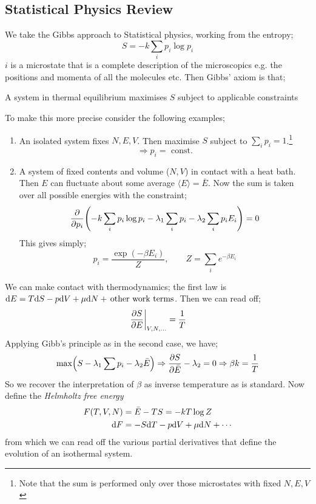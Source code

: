 \subsection{Statistical Physics Review}
We take the Gibbs approach to Statistical physics, working from the entropy;
\begin{equation}
S = -k \sum_i{p_i \log p_i}
\end{equation}
$i$ is a microstate that is a complete description of the microscopics e.g. the positions and momenta of all the molecules etc. Then Gibbs' axiom is that;
\begin{examplebox}
A system in thermal equilibrium maximises $S$ subject to applicable constraints
\end{examplebox}
To make this more precise consider the following examples;
\begin{enumerate}
\item An isolated system fixes $N, E, V$. Then maximise $S$ subject to $\sum_i{p_i} = 1$.\footnote{Note that the sum is performed only over those microstates with fixed $N, E, V$}
\begin{equation}
\Rightarrow p_i = \text{ const.}
\end{equation}
\item A system of fixed contents and volume ($N,V$) in contact with a heat bath. Then $E$ can fluctuate about some average $\langle E \rangle = \bar{E}$. Now the sum is taken over all possible energies with the constraint;
\begin{equation}
\frac{\del}{\del p_i}\left(-k\sum_i{p_i \log p_i} - \lambda_1 \sum_i{p_i} - \lambda_2 \sum_i{p_i E_i}\right) = 0
\end{equation}
This gives simply;
\begin{equation}
p_i = \frac{\exp\left(-\beta E_i\right)}{Z}, \qquad Z = \sum_i{e^{-\beta E_i}}
\end{equation}
\end{enumerate}
We can make contact with thermodynamics; the first law is $\text{d} E = T\text{d} S - p\text{d} V + \mu \text{d} N + \,\text{other work terms}$. Then we can read off;
\begin{equation}
\left.\frac{\del S}{\del E}\right|_{V, N, \ldots} = \frac{1}{T}
\end{equation}
Applying Gibb's principle as in the second case, we have;
\begin{equation}
\max\left(S - \lambda_1\sum{p_i} - \lambda_2 \bar{E}\right) \Rightarrow \frac{\del S}{\del \bar{E}} - \lambda_2 = 0 \Rightarrow \beta k = \frac{1}{T}
\end{equation}
So we recover the interpretation of $\beta$ as inverse temperature as is standard. Now define the \emph{Helmholtz free energy}
\begin{align}
F(T, V, N) &= \bar{E} - TS = -kT \log Z \\
\text{d} F &= -S \text{d} T -p\text{d} V + \mu \text{d} N + \cdots
\end{align}
from which we can read off the various partial derivatives that define the evolution of an isothermal system.
